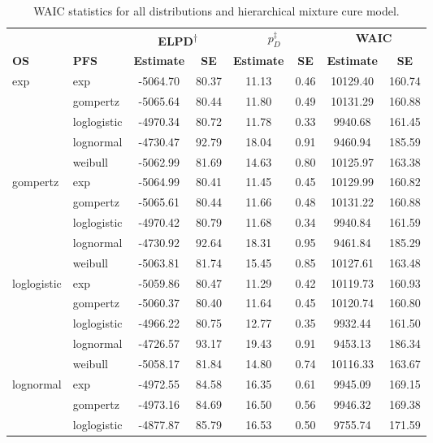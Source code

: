 \documentclass[AMA,STIX1COL]{WileyNJD-v2}
\begin{document}
\begin{table}[H]
\caption{WAIC statistics for all distributions and hierarchical mixture cure model. \label{tab:waic_hier}}
\centering
\begin{tabular}{l l c c c c c c}
\toprule
\multicolumn{1}{l}{} & \multicolumn{1}{l}{} & \multicolumn{2}{c}{\textbf{ELPD\textsuperscript{$\dagger$}}} & \multicolumn{2}{c}{\textbf{$p_D^{\ddagger}$}} & \multicolumn{2}{c}{\textbf{WAIC}} \\
\cmidrule{3-4}\cmidrule{5-6}\cmidrule{7-8}
\textbf{OS} & \textbf{PFS} & \textbf{Estimate} & \textbf{SE} & \textbf{Estimate} & \textbf{SE} & \textbf{Estimate} & \textbf{SE}\\
\midrule
exp & exp & -5064.70 & 80.37 & 11.13 & 0.46 & 10129.40 & 160.74\\
 & gompertz & -5065.64 & 80.44 & 11.80 & 0.49 & 10131.29 & 160.88\\
 & loglogistic & -4970.34 & 80.72 & 11.78 & 0.33 & 9940.68 & 161.45\\
 & lognormal & -4730.47 & 92.79 & 18.04 & 0.91 & 9460.94 & 185.59\\
 & weibull & -5062.99 & 81.69 & 14.63 & 0.80 & 10125.97 & 163.38\\
gompertz & exp & -5064.99 & 80.41 & 11.45 & 0.45 & 10129.99 & 160.82\\
 & gompertz & -5065.61 & 80.44 & 11.66 & 0.48 & 10131.22 & 160.88\\
 & loglogistic & -4970.42 & 80.79 & 11.68 & 0.34 & 9940.84 & 161.59\\
 & lognormal & -4730.92 & 92.64 & 18.31 & 0.95 & 9461.84 & 185.29\\
 & weibull & -5063.81 & 81.74 & 15.45 & 0.85 & 10127.61 & 163.48\\
loglogistic & exp & -5059.86 & 80.47 & 11.29 & 0.42 & 10119.73 & 160.93\\
 & gompertz & -5060.37 & 80.40 & 11.64 & 0.45 & 10120.74 & 160.80\\
 & loglogistic & -4966.22 & 80.75 & 12.77 & 0.35 & 9932.44 & 161.50\\
 & lognormal & -4726.57 & 93.17 & 19.43 & 0.91 & 9453.13 & 186.34\\
 & weibull & -5058.17 & 81.84 & 14.80 & 0.74 & 10116.33 & 163.67\\
lognormal & exp & -4972.55 & 84.58 & 16.35 & 0.61 & 9945.09 & 169.15\\
 & gompertz & -4973.16 & 84.69 & 16.50 & 0.56 & 9946.32 & 169.38\\
 & loglogistic & -4877.87 & 85.79 & 16.53 & 0.50 & 9755.74 & 171.59\\

\end{tabular}
\end{table}
\end{document}
